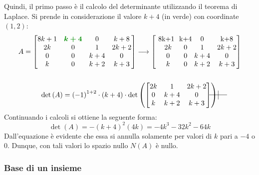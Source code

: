 \documentclass[a4paper]{article}
\makeatletter
\newcommand{\MyTikzmark}[2]{%
	\tikz[overlay,remember picture,baseline] \node [anchor=base] (#1) {#2};%
}
\newcommand{\DrawVLine}[3][]{%
	\begin{tikzpicture}[overlay,remember picture]
		\draw[shorten <=0.3ex, #1] (#2.north) -- (#3.south);
	\end{tikzpicture}
}
\newcommand{\DrawHLine}[3][]{%
	\begin{tikzpicture}[overlay,remember picture]
		\draw[shorten <=0.2em, #1] (#2.west) -- (#3.east);
	\end{tikzpicture}
}
\newenvironment{rowequmatbra}[1]{\left[\array{@{}#1@{}}}{\endarray\right]}
\makeatother
\begin{document}
	\noindent
	Quindi, il \textcolor{Red3}{primo passo} è il calcolo del determinante utilizzando il teorema di Laplace. Si prende in considerazione il valore $k+4$ (in verde) con coordinate $\left(1,2\right)$:
	\begin{gather*}
		A = \begin{bmatrix}
			8k+1	& \textcolor{Green4}{\boldsymbol{k+4}}	& 0		& k+8 	\\
			2k 		& 0 	& 1 	& 2k+2 	\\
			0		& 0 	& k+4 	& 0 	\\
			k		& 0 	& k+2 	& k+3
		\end{bmatrix} \longrightarrow
		\begin{rowequmatbra}{cccc}
			\phantom{000}\MyTikzmark{s_row}{8k+1}\phantom{000}	& \MyTikzmark{s_col}{k+4}	& 0		& \MyTikzmark{f_row}{k+8} 	\\
			\phantom{0}2k 		& 0 	& 1 	& 2k+2 	\\
			\phantom{0}0		& 0 	& k+4 	& 0 	\\
			\phantom{0}k		& \MyTikzmark{f_col}{0} 	& k+2 	& k+3
		\end{rowequmatbra} \\
		\\
		\det\left(A\right) = \left(-1\right)^{1+2} \cdot \left(k+4\right) \cdot \det\left(\begin{bmatrix}
			2k 	& 1 	& 2k+2	\\
			0 	& k+4 	& 0 	\\
			k 	& k+2 	& k+3
		\end{bmatrix}\right)
		\DrawHLine{s_row}{f_row}
		\DrawVLine{s_col}{f_col}
	\end{gather*}
	Continuando i calcoli si ottiene la seguente forma:
	\begin{equation*}
		\det\left(A\right) = -\left(k+4\right)^{2}\left(4k\right) = -4k^{3} - 32k^{2} - 64k
	\end{equation*}
	Dall'equazione è evidente che essa si annulla solamente per valori di $k$ pari a $-4$ o $0$. Dunque, con tali valori lo spazio nullo $N\left(A\right)$ è nullo.\newpage
	
	\subsubsection{Base di un insieme}
	
\end{document}
